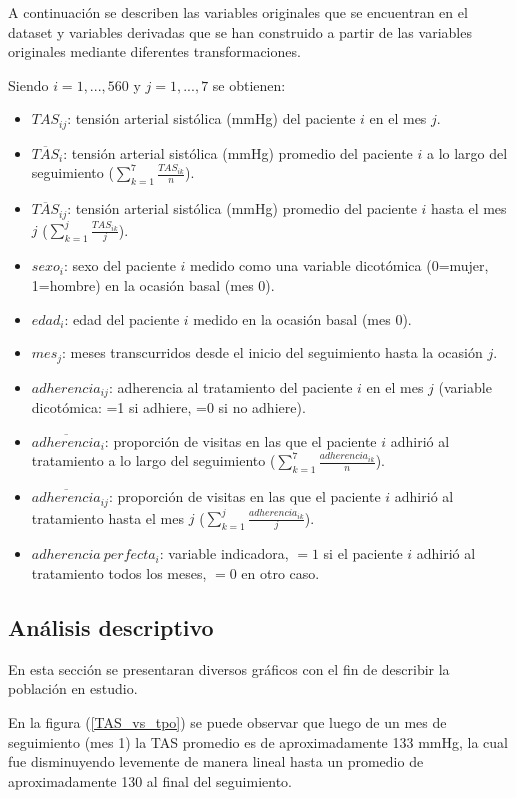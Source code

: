 \documentclass[spanish]{article}
\numberwithin{figure}{subsection}
\numberwithin{equation}{subsection}
\numberwithin{table}{subsection}
\def\npatients{560}
\begin{document}
A continuación se describen las variables originales que se encuentran en el
dataset y variables derivadas que se han construido a partir de las variables
originales mediante diferentes transformaciones.

Siendo $ i = 1, ..., \npatients{}$ y $j = 1, ..., 7$ se obtienen:

\begin{itemize}
	\item $TAS_{ij}$: tensión arterial sistólica (mmHg) del paciente $i$ en el
	mes $j$.
	\item $\overline{TAS}_{i}$: tensión arterial sistólica (mmHg) promedio del
	paciente $i$ a lo largo del seguimiento ($\sum_{k=1}^7 \frac{TAS_{ik}}{n}$).
	\item $\overline{TAS}_{ij}$: tensión arterial sistólica (mmHg) promedio del
	paciente $i$ hasta el mes $j$ ($\sum_{k=1}^j \frac{TAS_{ik}}{j}$).
	\item $sexo_i$: sexo del paciente $i$ medido como una variable dicotómica
	(0=mujer, 1=hombre) en la ocasión basal (mes 0).
	\item $edad_i$: edad del paciente $i$ medido en la ocasión basal (mes 0).
	\item $mes_j$: meses transcurridos desde el inicio del seguimiento hasta la
	ocasión $j$.
	\item $adherencia_{ij}$: adherencia al tratamiento del paciente $i$ en el
	mes $j$ (variable dicotómica: =1 si adhiere, =0 si no adhiere).
	\item $\overline{adherencia}_i$: proporción de visitas en las que el
	paciente $i$ adhirió al tratamiento a lo largo del seguimiento
	($\sum_{k=1}^7 \frac{adherencia_{ik}}{n}$).
	\item $\overline{adherencia}_{ij}$: proporción de visitas en las que el
	paciente $i$ adhirió al tratamiento hasta el mes $j$ ($\sum_{k=1}^j
	\frac{adherencia_{ik}}{j}$).
	\item $adherencia\ perfecta_i$: variable indicadora, $=1$ si el paciente
	$i$ adhirió al tratamiento todos los meses, $=0$ en otro caso.
\end{itemize}

\subsection{Análisis descriptivo}

En esta sección se presentaran diversos gráficos con el fin de describir la
población en estudio.

En la figura (\ref{TAS_vs_tpo}) se puede observar que luego de un mes de
seguimiento (mes 1) la TAS promedio es de aproximadamente 133 mmHg, la cual fue
disminuyendo levemente de manera lineal hasta un promedio de aproximadamente 130
al final del seguimiento.
\end{document}

